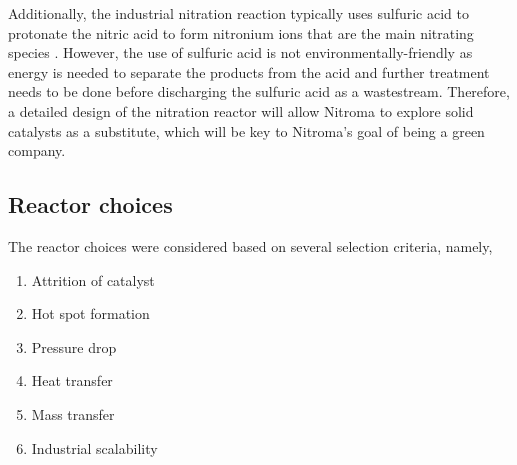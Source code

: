 Additionally, the industrial nitration reaction typically uses sulfuric acid to protonate the nitric acid to form nitronium ions that are the main nitrating species \cite{sreedhar_scientific_2013}. However, the use of sulfuric acid is not environmentally-friendly as energy is needed to separate the products from the acid and further treatment needs to be done before discharging the sulfuric acid as a wastestream. Therefore, a detailed design of the nitration reactor will allow Nitroma to explore solid catalysts as a substitute, which will be key to Nitroma's goal of being a green company.  

\subsection{Reactor choices}
The reactor choices were considered based on several selection criteria, namely,
\begin{enumerate}
    \item Attrition of catalyst
    \item Hot spot formation
    \item Pressure drop
    \item Heat transfer
    \item Mass transfer
    \item Industrial scalability
\end{enumerate}

